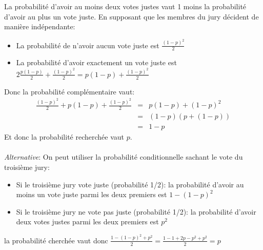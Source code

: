 La probabilité d'avoir au moins deux votes justes vaut 1 moins la probabilité d'avoir au plus un vote juste. En supposant que les membres du jury décident de manière indépendante:
\begin{itemize}
  \item La probabilité de n'avoir aucun vote juste est $\frac{(1-p)^2}{2}$
  \item La probabilité d'avoir exactement un vote juste est $2\frac{p(1-p)}{2}+\frac{(1-p)^2}{2}=p(1-p)+\frac{(1-p)^2}{2}$
\end{itemize}
Donc la probabilité complémentaire vaut: 
\begin{eqnarray*}
\frac{(1-p)^2}{2}+p(1-p)+\frac{(1-p)^2}{2} &=& p(1-p)+(1-p)^2  \\
&=& (1-p)(p+(1-p))\\
&=&1-p
\end{eqnarray*}
Et donc la probabilité recherchée vaut $p$.\\ \\
\textit{Alternative}: On peut utiliser la probabilité conditionnelle sachant le vote du troisième jury:
\begin{itemize}
  \item Si le troisième jury vote juste (probabilité 1/2): la probabilité d'avoir au moins un vote juste parmi les deux premiers est $1-(1-p)^2$
  \item Si le troisième jury ne vote pas juste (probabilité 1/2): la probabilité d'avoir deux votes justes parmi les deux premiers est $p^2$
\end{itemize}
la probabilité cherchée vaut donc $\frac{1-(1-p)^2+p^2}{2}=\frac{1-1+2p-p^2+p^2}{2}=p$
